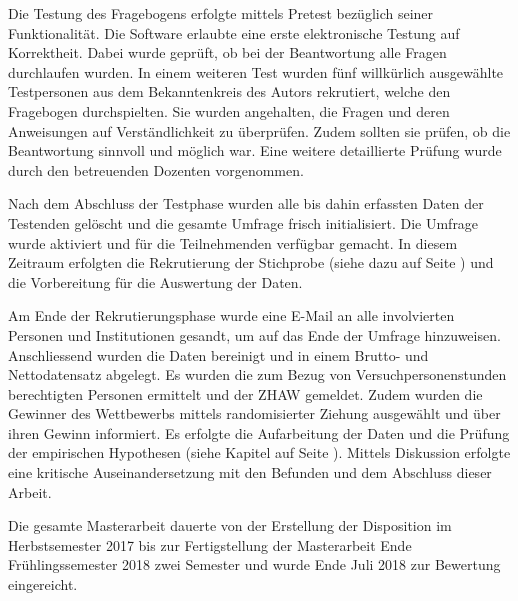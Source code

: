 Die Testung des Fragebogens erfolgte mittels Pretest bezüglich seiner Funktionalität. Die Software erlaubte eine erste elektronische Testung auf Korrektheit. Dabei wurde geprüft, ob bei der Beantwortung alle Fragen durchlaufen wurden. In einem weiteren Test wurden fünf willkürlich ausgewählte Testpersonen aus dem Bekanntenkreis des Autors rekrutiert, welche den Fragebogen durchspielten. Sie wurden angehalten, die Fragen und deren Anweisungen auf Verständlichkeit zu überprüfen. Zudem sollten sie prüfen, ob die Beantwortung sinnvoll und möglich war. Eine weitere detaillierte Prüfung wurde durch den betreuenden Dozenten vorgenommen. 

Nach dem Abschluss der Testphase wurden alle bis dahin erfassten Daten der Testenden gelöscht und die gesamte Umfrage frisch initialisiert. Die Umfrage wurde aktiviert und für die Teilnehmenden verfügbar gemacht. In diesem Zeitraum erfolgten die Rekrutierung der Stichprobe (siehe dazu \textit{} auf Seite \pageref{sec:Datenerhebung}) und die Vorbereitung für die Auswertung der Daten. 

Am Ende der Rekrutierungsphase wurde eine E-Mail an alle involvierten Personen und Institutionen gesandt, um auf das Ende der Umfrage hinzuweisen. Anschliessend wurden die Daten bereinigt und in einem Brutto- und Nettodatensatz abgelegt. Es wurden die zum Bezug von Versuchpersonenstunden berechtigten Personen ermittelt und der ZHAW gemeldet. Zudem wurden die Gewinner des Wettbewerbs mittels randomisierter Ziehung ausgewählt und über ihren Gewinn informiert. Es erfolgte die Aufarbeitung der Daten und die Prüfung der empirischen Hypothesen (siehe Kapitel \textit{} auf Seite \pageref{sec:EmpirischeHypothesen}). Mittels Diskussion erfolgte eine kritische Auseinandersetzung mit den Befunden und dem Abschluss dieser Arbeit.

Die gesamte Masterarbeit dauerte von der Erstellung der Disposition im Herbstsemester 2017 bis zur Fertigstellung der Masterarbeit Ende Frühlingssemester 2018 zwei Semester und wurde Ende Juli 2018 zur Bewertung eingereicht.

